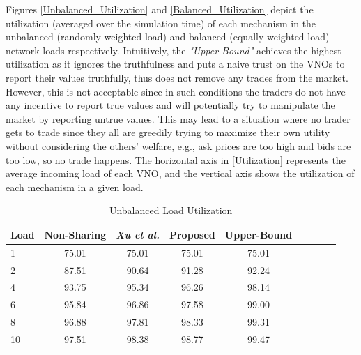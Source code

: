 Figures \ref{Unbalanced_Utilization} and \ref{Balanced_Utilization} depict the utilization (averaged over the simulation time) of each mechanism in the unbalanced (randomly weighted load) and balanced (equally weighted load) network loads respectively. Intuitively, the \textit{"Upper-Bound"} achieves the highest utilization as it ignores the truthfulness and puts a naive trust on the \acp{VNO} to report their values truthfully, thus does not remove any trades from the market. However, this is not acceptable since in such conditions the traders do not have any incentive to report true values and will potentially try to manipulate the market by reporting untrue values. This may lead to a situation where no trader gets to trade since they all are greedily trying to maximize their own utility without considering the others' welfare, e.g., ask prices are too high and bids are too low, so no trade happens. The horizontal axis in \autoref{Utilization} represents the average incoming load of each \ac{VNO}, and the vertical axis shows the utilization of each mechanism in a given load.

\begin{table}[htbp]
   \caption{Unbalanced Load Utilization}
   \label{tab:util:unbal}
   \small %
   \centering %
   \begin{tabular}{lcccccccr} %
   \toprule[\heavyrulewidth]\toprule[\heavyrulewidth]
       Load & Non-Sharing    & \textit{Xu et al.} & Proposed    & Upper-Bound \\ \hline
   \midrule
    1  & 75.01  & 75.01 & 75.01 & 75.01\\
    2  & 87.51  & 90.64 & 91.28 & 92.24\\
    4  & 93.75  & 95.34 & 96.26 & 98.14\\
    6  & 95.84  & 96.86 & 97.58 & 99.00\\
    8  & 96.88  & 97.81 & 98.33 & 99.31\\
    10 & 97.51  & 98.38 & 98.77 & 99.47\\
   \bottomrule[\heavyrulewidth]
   \end{tabular}
\end{table}

